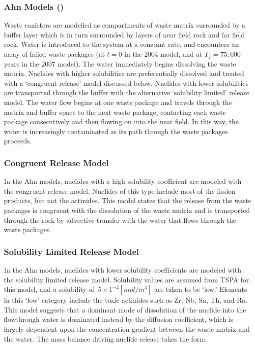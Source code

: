 \subsubsection{Ahn Models (\cite{ahn_environmental_2004, 
ahn_environmental_2007})}

Waste canisters are modelled as compartments of waste matrix 
surrounded by a buffer layer which is in turn surrounded by layers of 
near field rock and far field rock. Water is introduced to the system 
at a constant rate, and encounters an array of failed waste packages 
(at $t=0$ in the 2004 model, and at $T_f=75,000$ years in the 2007 
model). The water immediately begins dissolving the waste matrix.  
Nuclides with higher solubilities are preferentially dissolved and 
treated with a `congruent release' model discussed below. Nuclides 
with lower solubilities are transported through the buffer with the 
alternative `solubility limited' release model. The water flow begins 
at one waste package and travels through the matrix and buffer space 
to the next waste package, contacting each waste package consecutively 
and then flowing on into the near field. In this way, the water is 
increasingly contaminated as its path through the waste packages 
proceeds.  

\subsubsection{Congruent Release Model} 

In the Ahn models, nuclides with a high solubility coefficient are 
modeled with the congruent release model.  Nuclides of this type 
include most of the fission products, but not the actinides. This 
model states that the release from the waste packages is congruent 
with the dissolution of the waste matrix and is transported through 
the rock by advective transfer with the water that flows through the 
waste packages.  

\subsubsection{Solubility Limited Release Model}

In the Ahn models, nuclides with lower solubility coefficients are 
modeled with the solubility limited release model.  Solubility values 
are assumed from TSPA for this model, and a solubility of $~5\times 
1^{-2} [mol/m^3]$ are taken to be `low.' Elements in this `low' 
category include the toxic actinides such as Zr, Nb, Sn, Th, and Ra.  
This model suggests that a dominant mode of dissolution of the nuclide 
into the flowthrough water is dominated instead by the diffusion 
coefficient, which is largely dependent upon the concentration 
gradient between the waste matrix and the water. The mass balance 
driving nuclide release takes the form:

